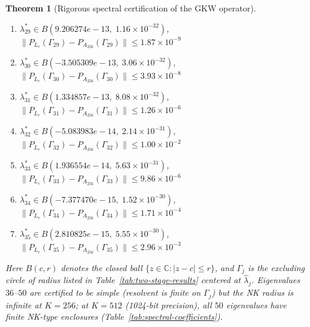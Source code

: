 \documentclass[11pt]{article}
\newtheorem{theorem}{Theorem}
\begin{document}
\begin{theorem}[Rigorous spectral certification of the GKW operator]
\begin{enumerate}
\item $\lambda_{29}^* \in B(9.206274e-13,\; 1.16 \times 10^{-32})$, \quad $\|P_{L_r}(\Gamma_{29}) - P_{A_{256}}(\Gamma_{29})\| \leq 1.87 \times 10^{-9}$
\item $\lambda_{30}^* \in B(-3.505309e-13,\; 3.06 \times 10^{-32})$, \quad $\|P_{L_r}(\Gamma_{30}) - P_{A_{256}}(\Gamma_{30})\| \leq 3.93 \times 10^{-8}$
\item $\lambda_{31}^* \in B(1.334857e-13,\; 8.08 \times 10^{-32})$, \quad $\|P_{L_r}(\Gamma_{31}) - P_{A_{256}}(\Gamma_{31})\| \leq 1.26 \times 10^{-6}$
\item $\lambda_{32}^* \in B(-5.083983e-14,\; 2.14 \times 10^{-31})$, \quad $\|P_{L_r}(\Gamma_{32}) - P_{A_{256}}(\Gamma_{32})\| \leq 1.00 \times 10^{-2}$
\item $\lambda_{33}^* \in B(1.936554e-14,\; 5.63 \times 10^{-31})$, \quad $\|P_{L_r}(\Gamma_{33}) - P_{A_{256}}(\Gamma_{33})\| \leq 9.86 \times 10^{-6}$
\item $\lambda_{34}^* \in B(-7.377470e-15,\; 1.52 \times 10^{-30})$, \quad $\|P_{L_r}(\Gamma_{34}) - P_{A_{256}}(\Gamma_{34})\| \leq 1.71 \times 10^{-4}$
\item $\lambda_{35}^* \in B(2.810825e-15,\; 5.55 \times 10^{-30})$, \quad $\|P_{L_r}(\Gamma_{35}) - P_{A_{256}}(\Gamma_{35})\| \leq 2.96 \times 10^{-3}$

\end{enumerate}
Here $B(c, r)$ denotes the closed ball $\{z \in \mathbb{C} : |z - c| \leq r\}$,
and $\Gamma_j$ is the excluding circle of radius listed in Table~\ref{tab:two-stage-results}
centered at $\hat\lambda_j$.
Eigenvalues $36$--$50$ are certified to be simple (resolvent is finite on $\Gamma_j$)
but the NK radius is infinite at $K = 256$; at $K = 512$ (1024-bit precision),
all $50$ eigenvalues have finite NK-type enclosures (Table~\ref{tab:spectral-coefficients}).


\end{theorem}
\end{document}
